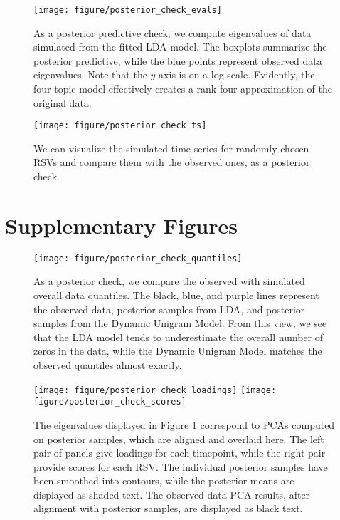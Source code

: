 \documentclass[oupdraft]{bio}
\begin{document}
\begin{figure}[!p]
  \centering
  \texttt{[image: figure/posterior\_check\_evals]}
  \caption{As a posterior predictive check, we compute eigenvalues of data
    simulated from the fitted LDA model. The boxplots summarize the posterior
    predictive, while the blue points represent observed data eigenvalues. Note
    that the $y$-axis is on a log scale. Evidently, the four-topic model
    effectively creates a rank-four approximation of the original
    data. \label{fig:antibiotics_posterior_evals}}
\end{figure}

\begin{figure}[!p]
  \centering
  \texttt{[image: figure/posterior\_check\_ts]}
  \caption{We can visualize the simulated time series for randomly chosen RSVs
    and compare them with the observed ones, as a posterior check.
    \label{fig:antibiotics_posterior_ts}}
\end{figure}


\section{Supplementary Figures}

\begin{figure}[!p]
  \centering
  \texttt{[image: figure/posterior\_check\_quantiles]}
  \caption{As a posterior check, we compare the observed with simulated overall
    data quantiles. The black, blue, and purple lines represent the observed
    data, posterior samples from LDA, and posterior samples from the Dynamic
    Unigram Model. From this view, we see that the LDA model tends to
    underestimate the overall number of zeros in the data, while the Dynamic
    Unigram Model matches the observed quantiles almost
    exactly. \label{fig:antibiotics_posterior_quantiles} }
\end{figure}


\begin{figure}[!p]
  \centering
  \texttt{[image: figure/posterior\_check\_loadings]}
  \texttt{[image: figure/posterior\_check\_scores]}
  \caption{The eigenvalues displayed in Figure
    \ref{fig:antibiotics_posterior_evals} correspond to PCAs computed on
    posterior samples, which are aligned and overlaid here. The left pair of
    panels give loadings for each timepoint, while the right pair provide scores
    for each RSV. The individual posterior samples have been smoothed into
    contours, while the posterior means are displayed as shaded text. The
    observed data PCA results, after alignment with posterior samples, are
    displayed as black text. \label{fig:antibiotics_posterior_pca} }
\end{figure}
\end{document}

